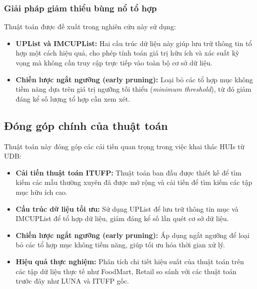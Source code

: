 \documentclass[conference]{IEEEtran}
\begin{document}
\subsubsection{Giải pháp giảm thiểu bùng nổ tổ hợp}
Thuật toán được đề xuất trong nghiên cứu này sử dụng:
\begin{itemize}
    \item \textbf{UPList và IMCUPList:} Hai cấu trúc dữ liệu này giúp lưu trữ thông tin tổ hợp một cách hiệu quả, cho phép tính toán giá trị hữu ích và xác suất kỳ vọng mà không cần truy cập trực tiếp vào toàn bộ cơ sở dữ liệu.
    \item \textbf{Chiến lược ngắt ngưỡng (early pruning):} Loại bỏ các tổ hợp mục không tiềm năng dựa trên giá trị ngưỡng tối thiểu (\textit{minimum threshold}), từ đó giảm đáng kể số lượng tổ hợp cần xem xét.
\end{itemize}

\subsection{Đóng góp chính của thuật toán}
Thuật toán này đóng góp các cải tiến quan trọng trong việc khai thác HUIs từ UDB:
\begin{itemize}
    \item \textbf{Cải tiến thuật toán ITUFP:} Thuật toán ban đầu được thiết kế để tìm kiếm các mẫu thường xuyên đã được mở rộng và cải tiến để tìm kiếm các tập mục hữu ích cao.
    \item \textbf{Cấu trúc dữ liệu tối ưu:} Sử dụng UPList để lưu trữ thông tin mục và IMCUPList để tổ hợp dữ liệu, giảm đáng kể số lần quét cơ sở dữ liệu.
    \item \textbf{Chiến lược ngắt ngưỡng (early pruning):} Áp dụng ngắt ngưỡng để loại bỏ các tổ hợp mục không tiềm năng, giúp tối ưu hóa thời gian xử lý.
    \item \textbf{Hiệu quả thực nghiệm:} Phân tích chi tiết hiệu suất của thuật toán trên các tập dữ liệu thực tế như FoodMart, Retail so sánh với các thuật toán trước đây như LUNA và ITUFP gốc.
\end{itemize}
\end{document}
